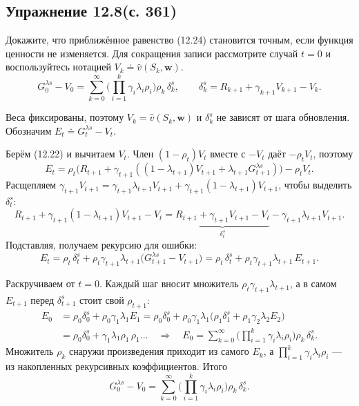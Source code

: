 \subsection{Упражнение 12.8(с. 361)}
Докажите, что приближённое равенство (12.24) становится точным, если функция
ценности не изменяется. Для сокращения записи рассмотрите случай $t=0$ и
воспользуйтесь нотацией $V_k \doteq \hat v(S_k,\mathbf w)$.
\begin{equation}
    G_0^{\lambda s} - V_0 = \sum_{k=0}^{\infty}\Big(\prod_{i=1}^{k}\gamma_i\lambda_i\rho_i\Big)\rho_k\,\delta_k^s,
    \qquad \delta_k^s = R_{k+1} + \gamma_{k+1}V_{k+1} - V_k.
    \tag{12.24}
\end{equation}
\begin{solution}
    Веса фиксированы, поэтому $V_k=\hat v(S_k,\mathbf w)$ и $\delta_k^s$ не зависят
    от шага обновления. Обозначим $E_t \doteq G_t^{\lambda s} - V_t$.

    Берём (12.22) и вычитаем $V_t$. Член $(1-\rho_t)V_t$ вместе с $-V_t$ даёт
    $-\rho_t V_t$, поэтому
    \begin{equation*}
        E_t = \rho_t\big(R_{t+1} + \gamma_{t+1}((1-\lambda_{t+1})V_{t+1} + \lambda_{t+1}G_{t+1}^{\lambda s})\big) - \rho_t V_t.
    \end{equation*}
    Расщепляем $\gamma_{t+1}V_{t+1} = \gamma_{t+1}\lambda_{t+1}V_{t+1} + \gamma_{t+1}(1-\lambda_{t+1})V_{t+1}$,
    чтобы выделить $\delta_t^s$:
    \begin{equation*}
        R_{t+1} + \gamma_{t+1}(1-\lambda_{t+1})V_{t+1} - V_t
        = \underbrace{R_{t+1} + \gamma_{t+1}V_{t+1} - V_t}_{\delta_t^s} - \gamma_{t+1}\lambda_{t+1}V_{t+1}.
    \end{equation*}
    Подставляя, получаем рекурсию для ошибки:
    \begin{equation*}
        E_t = \rho_t\,\delta_t^s + \rho_t\gamma_{t+1}\lambda_{t+1}\big(G_{t+1}^{\lambda s} - V_{t+1}\big)
        = \rho_t\,\delta_t^s + \rho_t\gamma_{t+1}\lambda_{t+1}\,E_{t+1}.
    \end{equation*}

    Раскручиваем от $t=0$. Каждый шаг вносит множитель $\rho_t\gamma_{t+1}\lambda_{t+1}$,
    а в самом $E_{t+1}$ перед $\delta_{t+1}^s$ стоит свой $\rho_{t+1}$:
    \begin{align*}
        E_0 &= \rho_0\delta_0^s + \rho_0\gamma_1\lambda_1 E_1
             = \rho_0\delta_0^s + \rho_0\gamma_1\lambda_1\big(\rho_1\delta_1^s + \rho_1\gamma_2\lambda_2 E_2\big)\\
            &= \rho_0\delta_0^s + \gamma_1\lambda_1\rho_1\,\rho_1... \quad\Longrightarrow\quad
            E_0 = \sum_{k=0}^{\infty}\Big(\prod_{i=1}^{k}\gamma_i\lambda_i\rho_i\Big)\rho_k\,\delta_k^s.
    \end{align*}
    Множитель $\rho_k$ снаружи произведения приходит из самого $E_k$, а
    $\prod_{i=1}^{k}\gamma_i\lambda_i\rho_i$ --- из накопленных рекурсивных
    коэффициентов. Итого
    \begin{equation*}
        G_0^{\lambda s} - V_0 = \sum_{k=0}^{\infty}\Big(\prod_{i=1}^{k}\gamma_i\lambda_i\rho_i\Big)\rho_k\,\delta_k^s.
    \end{equation*}


\end{solution}
